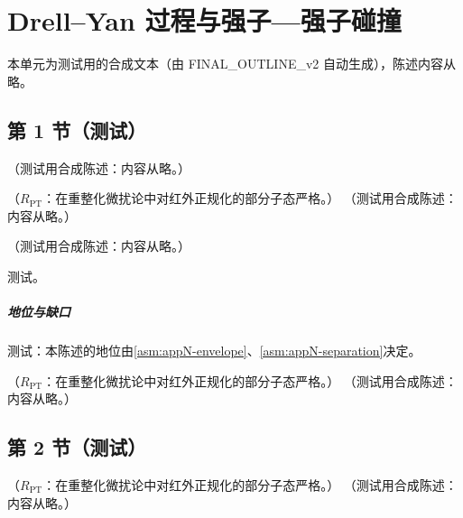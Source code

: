 \chapter{Drell–Yan 过程与强子—强子碰撞}\label{ch:dy}
本单元为测试用的合成文本（由 FINAL\_OUTLINE\_v2 自动生成），陈述内容从略。

\section{第 1 节（测试）}\label{sec:dy-born}

\begin{definition}[DY 运动学]\label{def:dy-kin}
（测试用合成陈述：内容从略。）
\end{definition}

\begin{proposition}\label{prop:dy-born}
（$R_{\mathrm{PT}}$：在重整化微扰论中对红外正规化的部分子态严格。）
（测试用合成陈述：内容从略。）
\end{proposition}

\begin{proposition}\label{prop:dy-regions}
（测试用合成陈述：内容从略。）
\end{proposition}
\begin{proofsketch}测试。\end{proofsketch}
\paragraph{地位与缺口}测试：本陈述的地位由\cref{asm:appN-envelope}、\cref{asm:appN-separation}决定。

\begin{proposition}\label{prop:dy-glauber-pinch}
（$R_{\mathrm{PT}}$：在重整化微扰论中对红外正规化的部分子态严格。）
（测试用合成陈述：内容从略。）
\end{proposition}

\section{第 2 节（测试）}\label{sec:dy-regions}

\begin{lemma}\label{lem:dy-poles-orientation}
（$R_{\mathrm{PT}}$：在重整化微扰论中对红外正规化的部分子态严格。）
（测试用合成陈述：内容从略。）
\end{lemma}

